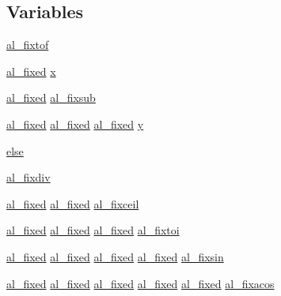\subsection*{Variables}
\begin{DoxyCompactItemize}
\item 
\hyperlink{fmaths_8inl_aa1e2c601fa27155cba5c96c6f7a541d6}{al\+\_\+fixtof}
\item 
\hyperlink{fixed_8h_acaad2e927f969d9882d1e1e80ac1c5e2}{al\+\_\+fixed} \hyperlink{fmaths_8inl_a7ba8ab2f1e8f362163e17da3f15a5db9}{x}
\item 
\hyperlink{fixed_8h_acaad2e927f969d9882d1e1e80ac1c5e2}{al\+\_\+fixed} \hyperlink{fmaths_8inl_a55d08ff07fc58a72689782633b1be661}{al\+\_\+fixsub}
\item 
\hyperlink{fixed_8h_acaad2e927f969d9882d1e1e80ac1c5e2}{al\+\_\+fixed} \hyperlink{fixed_8h_acaad2e927f969d9882d1e1e80ac1c5e2}{al\+\_\+fixed} \hyperlink{fixed_8h_acaad2e927f969d9882d1e1e80ac1c5e2}{al\+\_\+fixed} \hyperlink{fmaths_8inl_ad01ab75ae50a1a624185bfa014c66cfa}{y}
\item 
\hyperlink{fmaths_8inl_a0544c3fe466e421738dae463968b70ba}{else}
\item 
\hyperlink{fmaths_8inl_af483635343185572cba1f3f6b3ae6610}{al\+\_\+fixdiv}
\item 
\hyperlink{fixed_8h_acaad2e927f969d9882d1e1e80ac1c5e2}{al\+\_\+fixed} \hyperlink{fixed_8h_acaad2e927f969d9882d1e1e80ac1c5e2}{al\+\_\+fixed} \hyperlink{fmaths_8inl_a31b6976c5be1580f86dd6c83647e77cd}{al\+\_\+fixceil}
\item 
\hyperlink{fixed_8h_acaad2e927f969d9882d1e1e80ac1c5e2}{al\+\_\+fixed} \hyperlink{fixed_8h_acaad2e927f969d9882d1e1e80ac1c5e2}{al\+\_\+fixed} \hyperlink{fixed_8h_acaad2e927f969d9882d1e1e80ac1c5e2}{al\+\_\+fixed} \hyperlink{fmaths_8inl_a94eec075305949523ebacef79cfcdd43}{al\+\_\+fixtoi}
\item 
\hyperlink{fixed_8h_acaad2e927f969d9882d1e1e80ac1c5e2}{al\+\_\+fixed} \hyperlink{fixed_8h_acaad2e927f969d9882d1e1e80ac1c5e2}{al\+\_\+fixed} \hyperlink{fixed_8h_acaad2e927f969d9882d1e1e80ac1c5e2}{al\+\_\+fixed} \hyperlink{fixed_8h_acaad2e927f969d9882d1e1e80ac1c5e2}{al\+\_\+fixed} \hyperlink{fmaths_8inl_a03d9154dc756850ed2d0f47a3628dfd8}{al\+\_\+fixsin}
\item 
\hyperlink{fixed_8h_acaad2e927f969d9882d1e1e80ac1c5e2}{al\+\_\+fixed} \hyperlink{fixed_8h_acaad2e927f969d9882d1e1e80ac1c5e2}{al\+\_\+fixed} \hyperlink{fixed_8h_acaad2e927f969d9882d1e1e80ac1c5e2}{al\+\_\+fixed} \hyperlink{fixed_8h_acaad2e927f969d9882d1e1e80ac1c5e2}{al\+\_\+fixed} \hyperlink{fixed_8h_acaad2e927f969d9882d1e1e80ac1c5e2}{al\+\_\+fixed} \hyperlink{fmaths_8inl_a33dc8aebb53adf65d64aaf02f041ab33}{al\+\_\+fixacos}
\end{DoxyCompactItemize}


